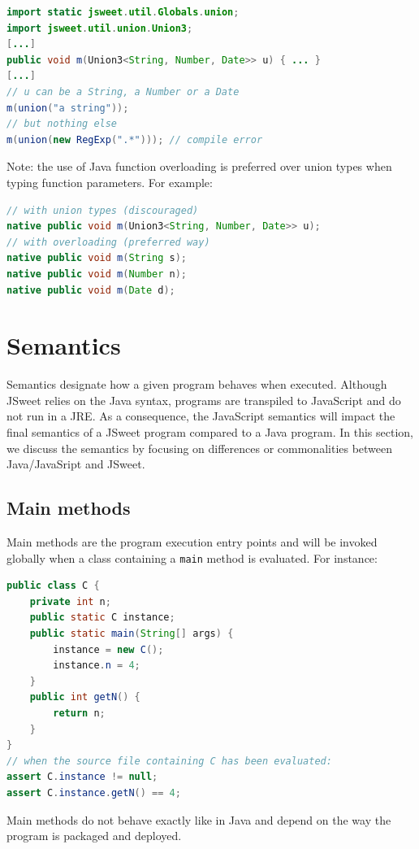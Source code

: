 \documentclass[a4paper]{report}
\begin{document}
\begin{lstlisting}[language=Java]
import static jsweet.util.Globals.union;
import jsweet.util.union.Union3;
[...]
public void m(Union3<String, Number, Date>> u) { ... }
[...]
// u can be a String, a Number or a Date
m(union("a string"));
// but nothing else
m(union(new RegExp(".*"))); // compile error
\end{lstlisting}

Note: the use of Java function overloading is preferred over union types when typing function parameters. For example:

\begin{lstlisting}[language=Java]
// with union types (discouraged)
native public void m(Union3<String, Number, Date>> u);
// with overloading (preferred way)
native public void m(String s);
native public void m(Number n);
native public void m(Date d);
\end{lstlisting}

\chapter{Semantics}
\label{semantics}

Semantics designate how a given program behaves when executed. Although JSweet relies on the Java syntax, programs are transpiled to JavaScript and do not run in a JRE. As a consequence, the JavaScript semantics will impact the final semantics of a JSweet program compared to a Java program. In this section, we discuss the semantics by focusing on differences or commonalities between Java/JavaSript and JSweet.

\section{Main methods}

Main methods are the program execution entry points and will be invoked globally when a class containing a \texttt{main} method is evaluated. For instance:

\begin{lstlisting}[language=Java]
public class C {
	private int n;
	public static C instance;
	public static main(String[] args) {
		instance = new C();
		instance.n = 4;
	}
	public int getN() {
		return n;
	}
}
// when the source file containing C has been evaluated:
assert C.instance != null;
assert C.instance.getN() == 4;
\end{lstlisting}

Main methods do not behave exactly like in Java and depend on the way the program is packaged and deployed. 
\end{document}
